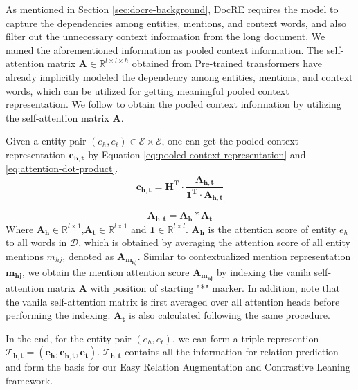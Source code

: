 \documentclass[11pt]{article}
\begin{document}
    As mentioned in Section \ref{sec:docre-background}, DocRE requires the model to capture the dependencies among entities, mentions, and context words, and also filter out the unnecessary context information from the long document. We named the aforementioned information as pooled context information. The self-attention matrix $\mathbf{A} \in \mathbb{R}^{l\times l \times h}$ obtained from Pre-trained transformers have already implicitly modeled the dependency among entities, mentions, and context words, which can be utilized for getting meaningful pooled context representation\citep{zhou_atlop_2021}. We follow \citet{zhou_atlop_2021} to obtain the pooled context information by utilizing the self-attention matrix $\mathbf{A}$.
    
    Given a entity pair $(e_h,e_t) \in \mathcal{E} \times \mathcal{E}$, one can get the pooled context representation $\mathbf{c_{h,t}}$ by Equation \ref{eq:pooled-context-representation} and \ref{eq:attention-dot-product}.
    \begin{equation}
        \label{eq:pooled-context-representation}
        \mathbf{c_{h,t} = H^T \cdot \frac{A_{h,t}}{1^T\cdot A_{h,t}}}
    \end{equation}
    
    \begin{equation}
        \label{eq:attention-dot-product}
        \mathbf{A_{h,t}} = \mathbf{A_h} * \mathbf{A_t}
    \end{equation}
    Where $\mathbf{A_h} \in \mathbb{R}^{l \times 1}$,$\mathbf{A_t} \in \mathbb{R}^{l \times 1}$ and $\mathbf{1} \in \mathbb{R}^{l \times l}$. $\mathbf{A_h}$ is the attention score of entity $e_h$ to all words in $\mathcal{D}$, which is obtained by averaging the attention score of all entity mentions $m_{hj}$, denoted as $\mathbf{A_{m_{hj}}}$. Similar to contextualized mention representation $\mathbf{m_{hj}}$, we obtain the mention attention score $\mathbf{A_{m_{hj}}}$ by indexing the vanila self-attention matrix $\mathbf{A}$ with position of starting "*" marker. In addition, note that the vanila self-attention matrix is first averaged over all attention heads before performing the indexing. $\mathbf{A_t}$ is also calculated following the same procedure.
    
    In the end, for the entity pair $(e_h,e_t)$, we can form a triple represention $\mathbf{\mathcal{T}_{h,t}} = \left( \mathbf{e_h},\mathbf{c_{h,t}},\mathbf{e_t} \right)$. $\mathbf{\mathcal{T}_{h,t}}$ contains all the information for relation prediction and form the basis for our Easy Relation Augmentation and Contrastive Leaning framework.
    
\end{document}
